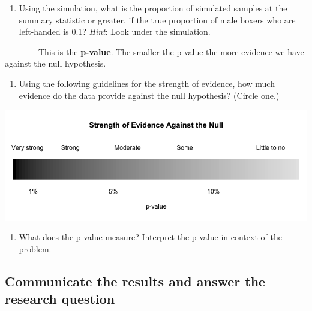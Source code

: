 \documentclass[
]{report}
\providecommand{\tightlist}{%
  \setlength{\itemsep}{0pt}\setlength{\parskip}{0pt}}
\begin{document}
\vspace{1in}

\begin{enumerate}
\def\labelenumi{\arabic{enumi}.}
\setcounter{enumi}{21}
\tightlist
\item
  Using the simulation, what is the proportion of simulated samples at the summary statistic or greater, if the true proportion of male boxers who are left-handed is 0.1? \emph{Hint}: Look under the simulation.
\end{enumerate}

\vspace{1in}

~~~~~~~~This is the \textbf{p-value}. The smaller the p-value the more evidence we have against the null hypothesis.

\begin{enumerate}
\def\labelenumi{\arabic{enumi}.}
\setcounter{enumi}{22}
\tightlist
\item
  Using the following guidelines for the strength of evidence, how much evidence do the data provide against the null hypothesis? (Circle one.)
\end{enumerate}

\begin{center}\includegraphics[width=0.9\linewidth]{images/soe_gradient_grayscale} \end{center}

\newpage

\begin{enumerate}
\def\labelenumi{\arabic{enumi}.}
\setcounter{enumi}{23}
\tightlist
\item
  What does the p-value measure? Interpret the p-value in context of the problem.
\end{enumerate}

\vspace{1in}

\hypertarget{communicate-the-results-and-answer-the-research-question}{%
\subsection*{Communicate the results and answer the research question}\label{communicate-the-results-and-answer-the-research-question}}
\end{document}
